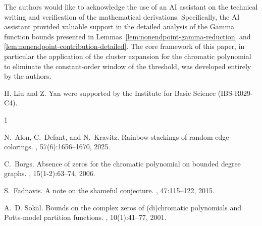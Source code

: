 \documentclass[11pt,reqno]{amsart}
\theoremstyle{definition}
\theoremstyle{remark}
\begin{document}
The authors would like to acknowledge the use of an AI assistant on the technical writing and verification of the mathematical derivations. Specifically, the AI assistant provided valuable support in the detailed analysis of the Gamma function bounds presented in Lemmas~\ref{lem:nonendpoint-gamma-reduction} and \ref{lem:nonendpoint-contribution-detailed}. The core framework of this paper, in particular the application of the cluster expansion for the chromatic polynomial to eliminate the constant-order window of the threshold, was developed entirely by the authors.

H. Liu and Z. Yan were supported by the Institute for Basic Science (IBS-R029-C4). 
\medskip

\begin{thebibliography}{1}

N.~Alon, C.~Defant, and N.~Kravitz.
\newblock Rainbow stackings of random edge-colorings.
, 57(6):1656--1670, 2025.

C.~Borgs.
\newblock Absence of zeros for the chromatic polynomial on bounded degree graphs.
, 15(1-2):63--74, 2006.

S.~Fadnavis.
\newblock A note on the shameful conjecture.
, 47:115--122, 2015.

A.~D. Sokal.
\newblock Bounds on the complex zeros of (di)chromatic polynomials and {P}otts-model partition functions.
, 10(1):41--77, 2001.

\end{thebibliography}
\end{document}
